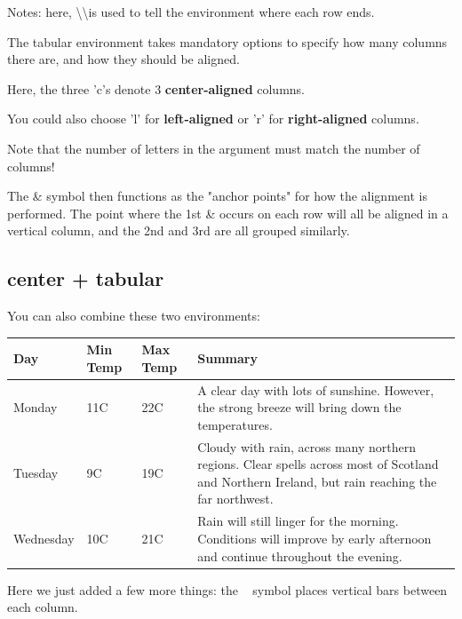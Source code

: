 \documentclass{article}
\begin{document}
        Notes: here, \textbackslash\textbackslash is used to tell the environment where each row ends.
        
        The tabular environment takes mandatory options to specify how many columns there are, and how they should be aligned.
        
        Here, the three 'c's denote 3 \textbf{center-aligned} columns. 
        
        You could also choose 'l' for \textbf{left-aligned} or 'r' for \textbf{right-aligned} columns.
        
        Note that the number of letters in the argument must match the number of columns!
        
        The \& symbol then functions as the "anchor points" for how the alignment is performed. The point where the 1st \& occurs on each row will all be aligned in a vertical column, and the 2nd and 3rd are all grouped similarly.

    \subsection{center + tabular}
        You can also combine these two environments:
        
        \begin{center}
            \begin{tabular}{| l | l | l | p{5cm} |}
            \hline
            Day & Min Temp & Max Temp & Summary \\ \hline
            Monday & 11C & 22C & A clear day with lots of sunshine.
            However, the strong breeze will bring down the temperatures. \\ \hline
            Tuesday & 9C & 19C & Cloudy with rain, across many northern regions. Clear spells 
            across most of Scotland and Northern Ireland, 
            but rain reaching the far northwest. \\ \hline
            Wednesday & 10C & 21C & Rain will still linger for the morning. 
            Conditions will improve by early afternoon and continue 
            throughout the evening. \\
            \hline
            \end{tabular}
        \end{center}
        
        Here we just added a few more things: the \textbar~ symbol places vertical bars between each column.
        
\end{document}
